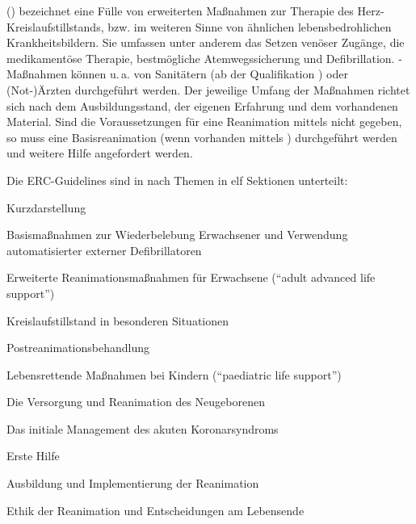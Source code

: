 \clearpage %
\Text
{{\TxBeschreibung}}%
{%
 () bezeichnet eine Fülle
von erweiterten Maßnahmen zur Therapie des
Herz-Kreislaufstillstands, bzw. im weiteren Sinne von
ähnlichen lebensbedrohlichen Krankheitsbildern. Sie umfassen
unter anderem das Setzen venöser Zugänge, die medikamentöse
Therapie, bestmögliche Atemwegssicherung und Defibrillation.
-Maßnahmen können 
u.\,a. von Sanitätern (ab der Qualifikation ) oder
(Not-)Ärzten durchgeführt werden. Der jeweilige Umfang der Maßnahmen
richtet sich nach dem Ausbildungsstand, der eigenen
Erfahrung und dem vorhandenen Material. Sind die
Voraussetzungen für eine Reanimation mittels 
nicht gegeben, so muss eine Basisreanimation (wenn
vorhanden mittels ) durchgeführt werden und weitere
Hilfe angefordert werden. 

Die ERC-Guidelines sind in nach Themen in elf Sektionen unterteilt:
\begin{compactenum}
  \item Kurzdarstellung 
  \cite{Erc-2015-Sektion-01-De,Erc-2015-Section-01}

  \item Basismaßnahmen zur Wiederbelebung Erwachsener 
  und Verwendung automatisierter externer Defibrillatoren 
  \cite{Erc-2015-Sektion-02-De,Erc-2015-Section-02}

  \item Erweiterte Reanimationsmaßnahmen für Erwachsene 
  (\enquote{adult advanced life support}) 
  \cite{Erc-2015-Sektion-03-De,Erc-2015-Section-03}

  \item Kreislaufstillstand in besonderen Situationen 
  \cite{Erc-2015-Sektion-04-De,Erc-2015-Section-04}

  \item Postreanimationsbehandlung 
  \cite{Erc-2015-Sektion-05-De,Erc-2015-Section-05}

  \item Lebensrettende Maßnahmen bei Kindern 
  (\enquote{paediatric life support})
  \cite{Erc-2015-Sektion-06-De,Erc-2015-Section-06}

  \item Die Versorgung 
  und Reanimation des Neugeborenen 
  \cite{Erc-2015-Sektion-07-De,Erc-2015-Section-07}

  \item Das initiale Management des akuten Koronarsyndroms
  \cite{Erc-2015-Sektion-08-De,Erc-2015-Section-08}

  \item Erste Hilfe 
  \cite{Erc-2015-Sektion-09-De,Erc-2015-Section-09}

  \item Ausbildung 
  und Implementierung der Reanimation 
  \cite{Erc-2015-Sektion-10-De,Erc-2015-Section-10}

  \item Ethik der Reanimation 
  und Entscheidungen am Lebensende 
  \cite{Erc-2015-Sektion-11-De,Erc-2015-Section-11}
\end{compactenum}
}%


